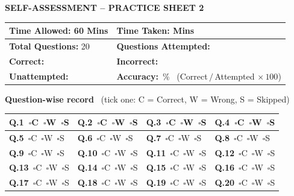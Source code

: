 \documentclass[11pt,a4paper]{article}
\begin{document}
\clearpage
\begin{center}{\Large\bfseries SELF-ASSESSMENT -- PRACTICE SHEET 2}\end{center}
\medskip
\renewcommand{\arraystretch}{1.9}
\noindent\begin{tabularx}{\linewidth}{|X|X|}\hline
\textbf{Time Allowed:} 60 Mins & \textbf{Time Taken:} \underline{\hspace{2.4cm}} Mins\\ \hline
\textbf{Total Questions:} 20 & \textbf{Questions Attempted:} \underline{\hspace{2cm}}\\ \hline
\textbf{Correct:} \underline{\hspace{2.6cm}} & \textbf{Incorrect:} \underline{\hspace{2.6cm}}\\ \hline
\textbf{Unattempted:} \underline{\hspace{2.2cm}} & \textbf{Accuracy:} \underline{\hspace{1.6cm}}\,\% \ {\footnotesize(Correct$\,/\,$Attempted$\,\times100$)}\\ \hline
\end{tabularx}
\renewcommand{\arraystretch}{1.0}
\bigskip
\textbf{Question-wise record} \ {\small(tick one: C = Correct, W = Wrong, S = Skipped)}\par\smallskip
{\small\renewcommand{\arraystretch}{1.55}
\noindent\begin{tabularx}{\linewidth}{|*{4}{>{\centering\arraybackslash}X|}}\hline
\textbf{Q.1}\ $\square$C\ $\square$W\ $\square$S & \textbf{Q.2}\ $\square$C\ $\square$W\ $\square$S & \textbf{Q.3}\ $\square$C\ $\square$W\ $\square$S & \textbf{Q.4}\ $\square$C\ $\square$W\ $\square$S \\ \hline
\textbf{Q.5}\ $\square$C\ $\square$W\ $\square$S & \textbf{Q.6}\ $\square$C\ $\square$W\ $\square$S & \textbf{Q.7}\ $\square$C\ $\square$W\ $\square$S & \textbf{Q.8}\ $\square$C\ $\square$W\ $\square$S \\ \hline
\textbf{Q.9}\ $\square$C\ $\square$W\ $\square$S & \textbf{Q.10}\ $\square$C\ $\square$W\ $\square$S & \textbf{Q.11}\ $\square$C\ $\square$W\ $\square$S & \textbf{Q.12}\ $\square$C\ $\square$W\ $\square$S \\ \hline
\textbf{Q.13}\ $\square$C\ $\square$W\ $\square$S & \textbf{Q.14}\ $\square$C\ $\square$W\ $\square$S & \textbf{Q.15}\ $\square$C\ $\square$W\ $\square$S & \textbf{Q.16}\ $\square$C\ $\square$W\ $\square$S \\ \hline
\textbf{Q.17}\ $\square$C\ $\square$W\ $\square$S & \textbf{Q.18}\ $\square$C\ $\square$W\ $\square$S & \textbf{Q.19}\ $\square$C\ $\square$W\ $\square$S & \textbf{Q.20}\ $\square$C\ $\square$W\ $\square$S \\ \hline
\end{tabularx}}
\end{document}
